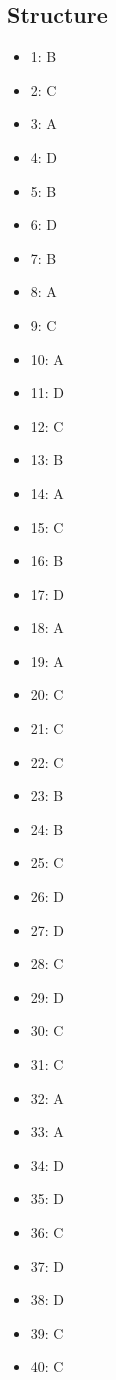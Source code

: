 \documentclass[12pt]{article}
\begin{document}
\subsection*{Structure}
\begin{itemize}[leftmargin=*]
\item 1: B
\item 2: C
\item 3: A
\item 4: D
\item 5: B
\item 6: D
\item 7: B
\item 8: A
\item 9: C
\item 10: A
\item 11: D
\item 12: C
\item 13: B
\item 14: A
\item 15: C
\item 16: B
\item 17: D
\item 18: A
\item 19: A
\item 20: C
\item 21: C
\item 22: C
\item 23: B
\item 24: B
\item 25: C
\item 26: D
\item 27: D
\item 28: C
\item 29: D
\item 30: C
\item 31: C
\item 32: A
\item 33: A
\item 34: D
\item 35: D
\item 36: C
\item 37: D
\item 38: D
\item 39: C
\item 40: C
\end{itemize}
\end{document}
